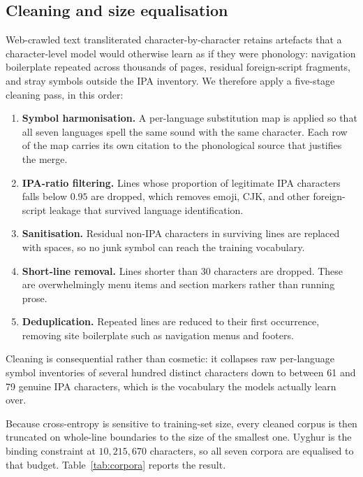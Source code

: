 \subsection{Cleaning and size equalisation}
\label{sec:data-clean}

Web-crawled text transliterated character-by-character retains artefacts that a character-level model would otherwise learn as if they were phonology: navigation boilerplate repeated across thousands of pages, residual foreign-script fragments, and stray symbols outside the IPA inventory. We therefore apply a five-stage cleaning pass, in this order:

\begin{enumerate}
\item \textbf{Symbol harmonisation.} A per-language substitution map is applied so that all seven languages spell the same sound with the same character. Each row of the map carries its own citation to the phonological source that justifies the merge.
\item \textbf{IPA-ratio filtering.} Lines whose proportion of legitimate IPA characters falls below $0.95$ are dropped, which removes emoji, CJK, and other foreign-script leakage that survived language identification.
\item \textbf{Sanitisation.} Residual non-IPA characters in surviving lines are replaced with spaces, so no junk symbol can reach the training vocabulary.
\item \textbf{Short-line removal.} Lines shorter than 30 characters are dropped. These are overwhelmingly menu items and section markers rather than running prose.
\item \textbf{Deduplication.} Repeated lines are reduced to their first occurrence, removing site boilerplate such as navigation menus and footers.
\end{enumerate}

Cleaning is consequential rather than cosmetic: it collapses raw per-language symbol inventories of several hundred distinct characters down to between 61 and 79 genuine IPA characters, which is the vocabulary the models actually learn over.

Because cross-entropy is sensitive to training-set size, every cleaned corpus is then truncated on whole-line boundaries to the size of the smallest one. Uyghur is the binding constraint at $10{,}215{,}670$ characters, so all seven corpora are equalised to that budget. Table~\ref{tab:corpora} reports the result.

